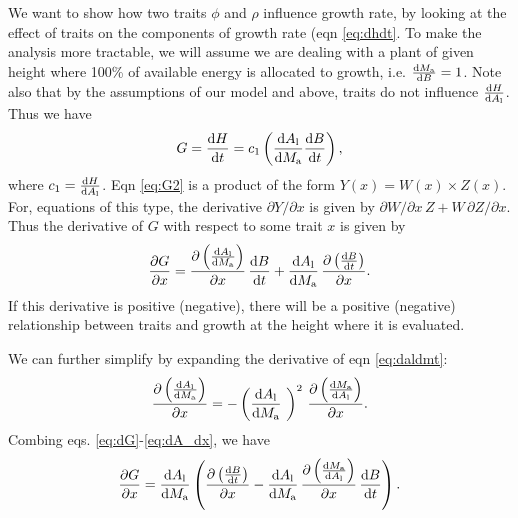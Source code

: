 \documentclass[a4paper,11pt]{article}
\begin{document}
We want to show how two traits $\phi$ and $\rho$ influence growth rate,
by looking at the effect of
traits on the components of growth rate (eqn \ref{eq:dhdt}. To make
the analysis more tractable, we will assume we are dealing with a plant of
given height where 100\% of available energy is allocated to growth,
i.e. $\frac{{\rm d}M_{\rm a}}{{\rm d}B}=1$. Note also
that by the assumptions of our model and above, traits do not influence
$\frac{{\rm d}H} {{\rm d}A_{\rm l}}$. Thus we have
\begin{equation} \label{eq:G2}
G = \frac{{\rm d}H}{{\rm d}t} = c_1   \left(\frac{{\rm d}A_{\rm l}} {{\rm d}M_{\rm a}}  \frac{ {\rm d}B} {{\rm d}t} \right),
\end{equation}
where $c_1 = \frac{{\rm d}H}{{\rm d}A_{\rm l}}$. Eqn
\ref{eq:G2} is a product of the form $Y(x) = W(x) \times Z(x)$. For,
equations of this type, the derivative $\partial{Y}/\partial{x}$ is
given by $\partial{W}/\partial{x} \, Z + W \, \partial{Z}/\partial{x}$. Thus
the derivative of $G$ with respect to some trait $x$  is given by
\begin{equation} \label{eq:dG}
\frac{\partial G} {\partial x} =
\frac{\partial \left(\frac{{\rm d}A_{\rm l}} {{\rm d}M_{\rm a}}\right)}{\partial x}
 \, \frac{ {\rm d}B} {{\rm d}t}
+ \frac{{\rm d}A_{\rm l}} {{\rm d}M_{\rm a}}
\, \frac{\partial \left( \frac{ {\rm d}B} {{\rm d}t}\right)}{\partial x}.
\end{equation}
If this derivative is positive (negative), there will be a positive (negative) relationship
between traits and growth at the height where it is evaluated.

We can further simplify by expanding the derivative of eqn \ref{eq:daldmt}:
\begin{equation} \label{eq:dA_dx}
\frac{\partial \left(\frac{{\rm d}A_{\rm l}} {{\rm d}M_{\rm a}}\right)}
{\partial x} = -\left(\frac{{\rm d}A_{\rm l}} {{\rm d}M_{\rm a}}\ \right)^2
\, \frac{\partial \left(\frac{{\rm d}M_{\rm a}} {{\rm d}A_{\rm l}}\right)
}{\partial x}.
\end{equation}
Combing eqs. \ref{eq:dG}-\ref{eq:dA_dx}, we have
\begin{equation} \label{eq:dG2}
\frac{\partial G} {\partial x} =
\frac{{\rm d}A_{\rm l}} {{\rm d}M_{\rm a}}
\left(
\frac{\partial \left( \frac{ {\rm d}B} {{\rm d}t}\right)}{\partial x}
- \frac{{\rm d}A_{\rm l}} {{\rm d}M_{\rm a}}
\,  \frac{\partial \left(\frac{{\rm d}M_{\rm a}} {{\rm d}A_{\rm l}}\right)
}{\partial x}
 \, \frac{ {\rm d}B} {{\rm d}t}
\right).
\end{equation}
\end{document}

